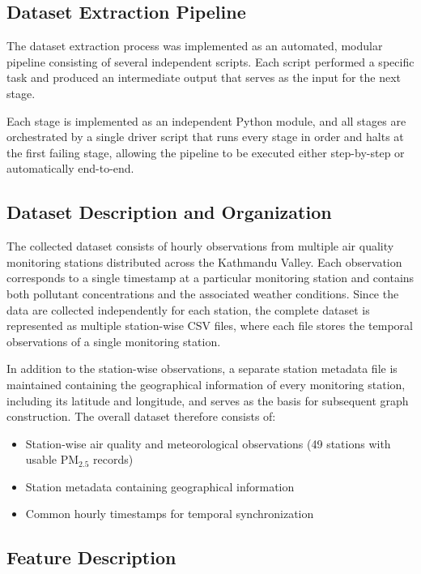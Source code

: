 \subsection{Dataset Extraction Pipeline}

The dataset extraction process was implemented as an automated, modular pipeline
consisting of several independent scripts. Each script performed a specific task and
produced an intermediate output that serves as the input for the next stage.

Each stage is implemented as an independent Python module, and all stages are
orchestrated by a single driver script that runs every stage in order and halts at the
first failing stage, allowing the pipeline to be executed either step-by-step or
automatically end-to-end.

\subsection{Dataset Description and Organization}

The collected dataset consists of hourly observations from multiple air quality
monitoring stations distributed across the Kathmandu Valley. Each observation
corresponds to a single timestamp at a particular monitoring station and contains both
pollutant concentrations and the associated weather conditions. Since the data are
collected independently for each station, the complete dataset is represented as
multiple station-wise CSV files, where each file stores the temporal observations of a
single monitoring station.

In addition to the station-wise observations, a separate station metadata file is
maintained containing the geographical information of every monitoring station,
including its latitude and longitude, and serves as the basis for subsequent graph
construction. The overall dataset therefore consists of:

\begin{itemize}
    \item Station-wise air quality and meteorological observations (49 stations with usable PM$_{2.5}$ records)
    \item Station metadata containing geographical information
    \item Common hourly timestamps for temporal synchronization
\end{itemize}

\subsection{Feature Description}

